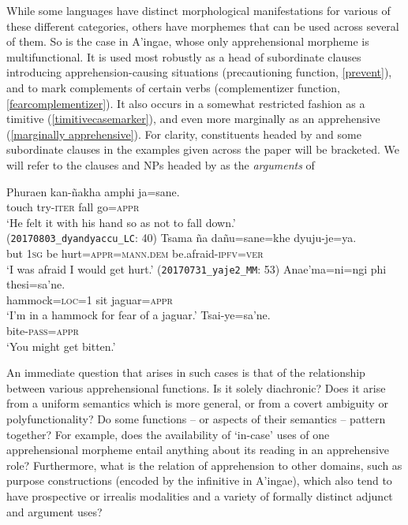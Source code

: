 \documentclass[output=paper,colorlinks,citecolor=brown]{langscibook}
\begin{document}
While some languages have distinct morphological manifestations for various of these different categories, others have morphemes that can be used across several of them. So is the case in A'ingae, whose only apprehensional morpheme  is multifunctional. It is used most robustly as a head of subordinate clauses introducing apprehension-causing situations (precautioning function, \ref{prevent}), and to mark complements of certain verbs (complementizer function, \ref{fearcomplementizer}). It also occurs in a somewhat restricted fashion as a timitive (\ref{timitivecasemarker}), and even more marginally as an apprehensive (\ref{marginally apprehensive}). For clarity, constituents headed by  and some subordinate clauses in the examples given across the paper will be bracketed. {We will refer to the clauses and NPs headed by  as the \textit{arguments} of \sane[.]}
\begin{exe}
    \ex \label{prevent} %
    \gll Phuraen kan-ñakha    {\ob}amphi ja=sane.{\cb} \\
         touch   try-\textsc{iter}  fall go=\textsc{appr}\\
    \glt `He felt {it} with his hand so as not to fall down.' \\
    \hfill (\texttt{20170803\_dyandyaccu\_LC}: {\textsc{40}})
    \ex \label{fearcomplementizer} %
    \gll Tsama ña   {\ob}{dañu=sane=khe{\cb}}         dyuju-je=ya. \\
         but \textsc{1sg} {be hurt=\textsc{appr=mann.dem}} {be.afraid-\textsc{ipfv=ver}}\\
    \glt `I was afraid I would get hurt.'
    \hfill (\texttt{20170731\_yaje2\_MM}: {\textsc{53}})
    \ex \label{timitivecasemarker} %
    \gll Anae'ma=ni=ngi phi {\ob}thesi=sa'ne.{\cb} \\
         hammock=\textsc{loc=}1 sit jaguar=\textsc{appr}   \\
    \glt `I'm in a hammock for fear of a jaguar.'
    \ex  \label{marginally apprehensive} %
    \gll {\ob}Tsai-ye=sa'ne.{\cb}   \\
         bite-\textsc{pass=appr}    \\
    \glt `You might get bitten.'
\end{exe}

An immediate question that arises in such cases is that of the relationship between various apprehensional functions. Is it solely diachronic? Does it arise from a uniform semantics which is more general, or from a covert ambiguity or polyfunctionality? Do some functions -- or aspects of their semantics -- pattern together? For example, does the availability of `in-case' uses of one apprehensional morpheme entail anything about its reading in an apprehensive role? {Furthermore, what is the relation of apprehension to other domains, such as purpose constructions (encoded by the infinitive in A'ingae), which also tend to have prospective or irrealis modalities and a variety of formally distinct adjunct and argument uses?}
\end{document}
